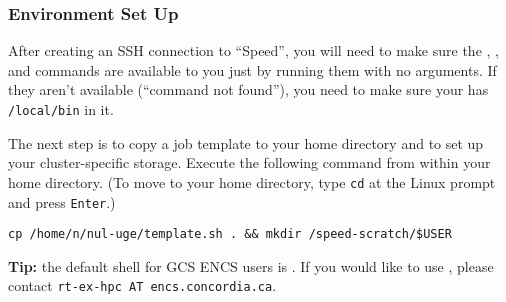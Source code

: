 ﻿%
\subsubsection{Environment Set Up}
\label{sect:envsetup}

After creating an SSH connection to ``Speed'', you will need to
make sure the , , and 
commands are available to you just by running them with no arguments.
If they aren't available (``command not found''), you need to make
sure your  has \texttt{/local/bin} in it.
%
%
%
%
%
%

The next step is to copy a job template to your home directory and to set up your
cluster-specific storage. Execute the following command from within your
home directory. (To move to your home directory, type \texttt{cd} at the Linux
prompt and press \texttt{Enter}.) 

\begin{verbatim}
cp /home/n/nul-uge/template.sh . && mkdir /speed-scratch/$USER
\end{verbatim}


\textbf{Tip:} the default shell for GCS ENCS users is .
If you would like to use , please contact 
\texttt{rt-ex-hpc AT encs.concordia.ca}.

